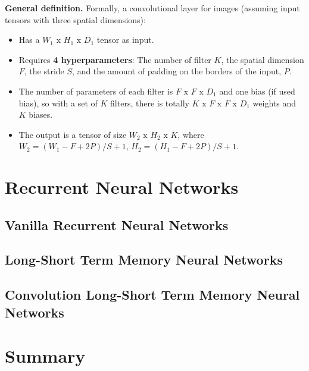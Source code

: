 \textbf{General definition.} Formally, a convolutional layer for images (assuming input tensors with three spatial dimensions):
\begin{itemize}
    \item Has a $\displaystyle W_1 \text{ x } H_1 \text{ x } D_1$ tensor as input.
    \item Requires \textbf{4 hyperparameters}: The number of filter $\displaystyle K$, the spatial dimension $\displaystyle F$, the stride $\displaystyle S$, and the amount of padding on the borders of the input, $\displaystyle P$.
    \item The number of parameters of each filter is $\displaystyle F \text{ x } F \text{ x } D_1$ and one bias (if used bias), so with a set of $\displaystyle K$ filters, there is totally $\displaystyle K \text{ x } F \text{ x } F \text{ x } D_1$ weights and $\displaystyle K$ biases.
    \item The output is a tensor of size $\displaystyle W_2 \text{ x } H_2 \text{ x } K$, where $\displaystyle W_2 = (W_1 - F + 2P)/S + 1$, $\displaystyle H_2 = (H_1 - F + 2P)/S + 1$.
\end{itemize}


\section{Recurrent Neural Networks}
\subsection{Vanilla Recurrent Neural Networks}


\subsection{Long-Short Term Memory Neural Networks}

\subsection{Convolution Long-Short Term Memory Neural Networks}


\section{Summary}
